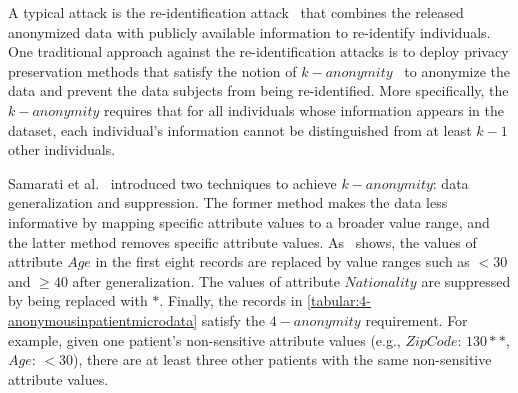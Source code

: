 A typical attack is the re-identification attack~\cite{sweeney1997weaving} that combines the released anonymized data with publicly available information to re-identify individuals. One traditional approach against the re-identification attacks is to deploy privacy preservation methods that satisfy the notion of $k-anonymity$~\cite{samarati1998protecting} to anonymize the data and prevent the data subjects from being re-identified. More specifically, the $k-anonymity$ requires that for all individuals whose information appears in the dataset, each individual's information cannot be distinguished from at least $k-1$ other individuals.

Samarati et al.~\cite{samarati1998protecting} introduced two techniques to achieve $k-anonymity$: data generalization and suppression. The former method makes the data less informative by mapping specific attribute values to a broader value range, and the latter method removes specific attribute values. As~\cite{tabular:4-anonymousinpatientmicrodata} shows, the values of attribute $Age$ in the first eight records are replaced by value ranges such as $<30$ and $\geq 40$ after generalization. The values of attribute $Nationality$ are suppressed by being replaced with $*$. Finally, the records in \autoref{tabular:4-anonymousinpatientmicrodata} satisfy the $4-anonymity$ requirement. For example, given one patient's non-sensitive attribute values (e.g., $Zip Code$: $130**$, $Age$: $<30$), there are at least three other patients with the same non-sensitive attribute values.



